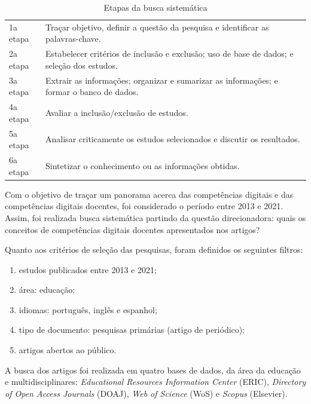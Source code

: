 \documentclass[portuguese]{textolivre}
\begin{document}
\begin{table}[htbp]
\centering
\begin{threeparttable}
    \caption{Etapas da busca sistemática}
    \label{tab01}
    \begin{tabular}{l p{}}
    \toprule
      1a etapa & Traçar objetivo, definir a questão da pesquisa e identificar as palavras-chave. \\
      2a etapa & Estabelecer critérios de inclusão e exclusão; uso de base de dados; e seleção dos estudos. \\
      3a etapa & Extrair as informações; organizar e sumarizar as informações; e formar o banco de dados. \\
      4a etapa & Avaliar a inclusão/exclusão de estudos. \\
      5a etapa & Analisar criticamente os estudos selecionados e discutir os resultados. \\
      6a etapa & Sintetizar o conhecimento ou as informações obtidas. \\
    \bottomrule
    \end{tabular}
\end{threeparttable}
\end{table}

Com o objetivo de traçar um panorama acerca das competências digitais e
das competências digitais docentes, foi considerado o período entre 2013
e 2021. Assim, foi realizada busca sistemática partindo da questão
direcionadora: quais os conceitos de competências digitais docentes
apresentados nos artigos?


Quanto aos critérios de seleção das pesquisas, foram definidos os
seguintes filtros:
\begin{enumerate}[label=\alph*)]
    \item estudos publicados entre 2013 e 2021;
    \item área: educação;
    \item idiomas: português, inglês e espanhol;
    \item tipo de documento: pesquisas primárias (artigo de periódico);
    \item artigos abertos ao público.
\end{enumerate}

A busca dos artigos foi realizada em quatro bases de dados, da área da
educação e multidisciplinares: \emph{Educational Resources Information
Center} (ERIC), \emph{Directory of Open Access Journals} (DOAJ),
\emph{Web of Science} (WoS) e \emph{Scopus }(Elsevier).
\end{document}
